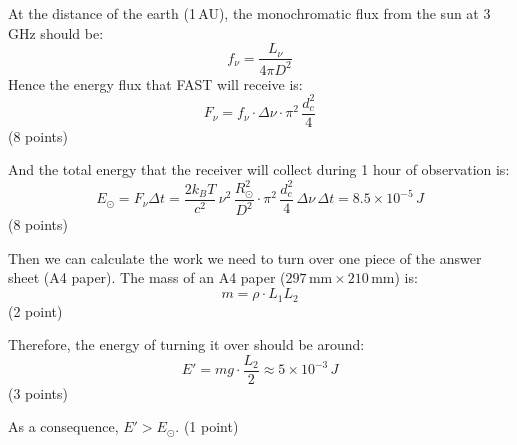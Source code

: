 At the distance of the earth (1\,AU), the monochromatic flux from the sun at
3\,GHz should be:
\[ f_\nu = \frac{L_\nu}{4\pi D^2} \]
Hence the energy flux that FAST will receive is:
\[ F_\nu = f_\nu \cdot \Delta\nu \cdot \pi^2\,\frac{d_c^2}{4} \]
\hfill(8 points)

And the total energy that the receiver will collect during 1 hour of
observation is:
\[ E_\odot = F_\nu\Delta t
   = \frac{2k_B T}{c^2}\,\nu^2\,\frac{R_\odot^2}{D^2}
     \cdot \pi^2\,\frac{d_c^2}{4}\,\Delta\nu\,\Delta t
   = 8.5\times10^{-5}\,J \]
\hfill(8 points)

Then we can calculate the work we need to turn over one piece of the answer
sheet (A4 paper). The mass of an A4 paper
($297\,\mathrm{mm}\times210\,\mathrm{mm}$) is:
\[ m = \rho \cdot L_1 L_2 \]
\hfill(2 point)

Therefore, the energy of turning it over should be around:
\[ E' = mg \cdot \frac{L_2}{2} \approx 5\times10^{-3}\,J \]
\hfill(3 points)

As a consequence, $E' > E_\odot$. \hfill(1 point)

